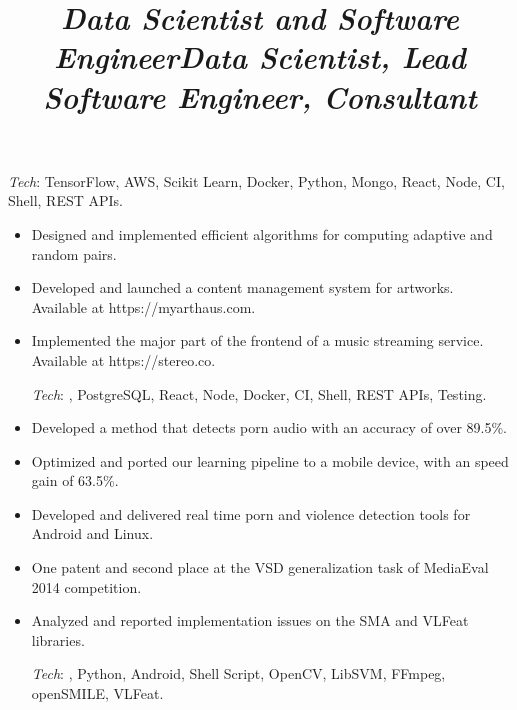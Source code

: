 \begin{resume}
\begin{position}
\begin{itemize}
\vspace{1mm}
{\small \emph{Tech}: TensorFlow, AWS, Scikit Learn, Docker, Python, Mongo, React, Node, CI, Shell, REST APIs.}
\end{itemize}
\end{position}

\title{\emph{Data Scientist and Software Engineer}}
\begin{position}
\vspace{1mm}
\begin{itemize}\small
\item Designed and implemented efficient algorithms for computing adaptive and random pairs.
\item Developed and launched a content management system for artworks. Available at https://myarthaus.com.
\item Implemented the major part of the frontend of a music streaming service. Available at https://stereo.co.

\vspace{1mm}
{\small \emph{Tech}: \Cplusplus, PostgreSQL, React, Node, Docker, CI, Shell, REST APIs, Testing.}
\end{itemize}
\end{position}

\title{\emph{Data Scientist, Lead Software Engineer, Consultant}}
\begin{position}
\vspace{1mm}
\begin{itemize}\small
\item Developed a method that detects porn audio with an accuracy of over 89.5\%.
\item Optimized and ported our learning pipeline to a mobile device, with
an speed gain of 63.5\%.
\item Developed and delivered real time porn and violence detection tools for Android and Linux.
\item One patent and second place at the VSD generalization task of MediaEval 2014 competition.
\item Analyzed and reported implementation issues on the SMA and VLFeat libraries.

\vspace{1mm}
{\small \emph{Tech}: \Cplusplus, Python, Android, Shell Script, OpenCV, LibSVM,
FFmpeg, openSMILE, VLFeat\@.}
\end{itemize}
\end{position}


\end{resume}
